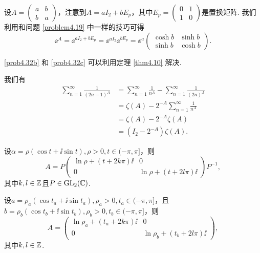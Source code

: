 \begin{solution}
  \begin{inparaenum}[(a)]
    \item 设$A=\begin{pmatrix}
      a & b \\
      b & a
    \end{pmatrix}$，注意到$A=aI_2+bE_p$，其中$E_p=\begin{pmatrix}
      0 & 1 \\
      1 & 0
    \end{pmatrix}$是置换矩阵. 我们利用和问题 \ref{problem4.19} 中一样的技巧可得
    \[
      \ee^A = \ee^{aI_2+bE_p} = \ee^{aI_2} \ee^{bE_p} = \ee^a \begin{pmatrix}
        \cosh b & \sinh b \\
        \sinh b & \cosh b
      \end{pmatrix}.
    \]

    \ref{prob4.32b} 和 \ref{prob4.32c} 可以利用定理 \ref{thm4.10} 解决.
    \setcounter{enumi}{3}

    \item 我们有
    \begin{align*}
      \sum_{n=1}^\infty \frac1{(2n-1)^A} & = \sum_{n=1}^\infty \frac1{n^A} - \sum_{n=1}^\infty \frac1{(2n)^A} \\
      & = \zeta(A) - 2^{-A} \sum_{n=1}^\infty\frac1{n^A} \\
      & = \zeta(A) - 2^{-A} \zeta(A) \\
      & = (I_2-2^{-A})\zeta(A).
    \end{align*}
  \end{inparaenum}
\end{solution}

\setcounter{solution}{35}
\begin{solution}
  设$\alpha=\rho(\cos t+\ii\sin t),\rho>0,t\in(-\pi,\pi]$，则
  \[
    A = P\begin{pmatrix}
      \ln\rho + (t+2k\pi)\ii & 0 \\
      0 & \ln\rho + (t+2l\pi)\ii
    \end{pmatrix} P^{-1},
  \]
  其中$k,l\in\mathbb Z$且$P\in\operatorname{GL}_2(\mathbb C)$.
\end{solution}

\begin{solution}
  设$a=\rho_a(\cos t_a+\ii\sin t_a),\rho_a>0,t_a\in(-\pi,\pi]$，且$b=\rho_b(\cos t_b+\ii\sin t_b),\rho_b>0,t_b\in(-\pi,\pi]$，则
  \[
    A = \begin{pmatrix}
      \ln\rho_a + (t_a+2k\pi)\ii & 0 \\
      0 & \ln\rho_b + (t_b+2l\pi)\ii
    \end{pmatrix},
  \]
  其中$k,l\in\mathbb Z$.
\end{solution}

